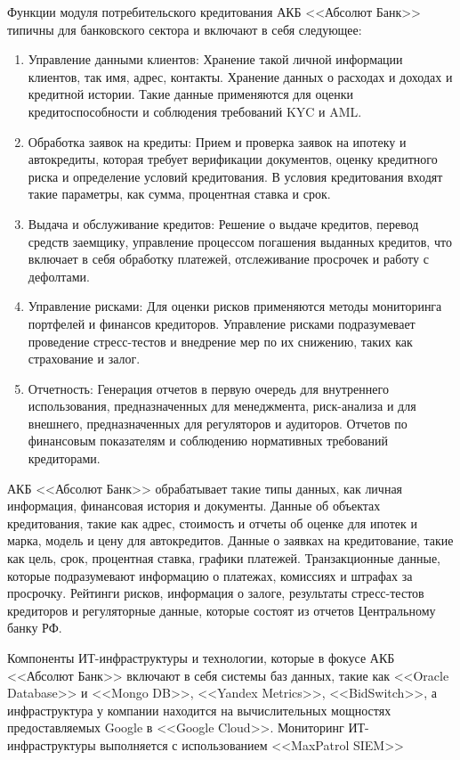 \documentclass[14pt, a4paper]{extarticle}
\begin{document}
Функции модуля потребительского кредитования АКБ <<Абсолют Банк>> типичны для
банковского сектора и включают в себя следующее:
\begin{enumerate}
	\item Управление данными клиентов: Хранение такой личной информации клиентов,
так имя, адрес, контакты. Хранение данных о расходах и доходах и кредитной
истории. Такие данные применяются для оценки кредитоспособности и соблюдения
требований KYC и AML.
	\item Обработка заявок на кредиты: Прием и проверка заявок на ипотеку и
автокредиты, которая требует верификации документов, оценку кредитного риска и
определение условий кредитования. В условия кредитования входят такие
параметры, как сумма, процентная ставка и срок.
	\item Выдача и обслуживание кредитов: Решение о выдаче кредитов, перевод
средств заемщику, управление процессом погашения выданных кредитов, что
включает в себя обработку платежей, отслеживание просрочек и работу с
дефолтами.
	\item Управление рисками: Для оценки рисков применяются методы мониторинга
портфелей и финансов кредиторов. Управление рисками подразумевает проведение
стресс-тестов и внедрение мер по их снижению, таких как страхование и залог.
	\item Отчетность: Генерация отчетов в первую очередь для внутреннего
использования, предназначенных для менеджмента, риск-анализа и для внешнего,
предназначенных для регуляторов и аудиторов. Отчетов по финансовым показателям
и соблюдению нормативных требований кредиторами.
\end{enumerate}

АКБ <<Абсолют Банк>> обрабатывает такие типы данных, как личная информация,
финансовая история и документы. Данные об объектах кредитования, такие как
адрес, стоимость и отчеты об оценке для ипотек и марка, модель и цену для
автокредитов. Данные о заявках на кредитование, такие как цель, срок,
процентная ставка, графики платежей. Транзакционные данные, которые
подразумевают информацию о платежах, комиссиях и штрафах за просрочку. Рейтинги
рисков, информация о залоге, результаты стресс-тестов кредиторов и регуляторные
данные, которые состоят из отчетов Центральному банку РФ.

Компоненты ИТ-инфраструктуры и технологии, которые в фокусе АКБ <<Абсолют
Банк>> включают в себя системы баз данных, такие как <<Oracle Database>> и
<<Mongo DB>>, <<Yandex Metrics>>, <<BidSwitch>>, а инфраструктура у компании
находится на вычислительных мощностях предоставляемых Google в <<Google
Cloud>>\;\cite{absolut-infrastructure-usage}. Мониторинг ИТ-инфраструктуры
выполняется с использованием <<MaxPatrol SIEM>>\;\cite{absolut-MaxPatrol-usage}
\end{document}
